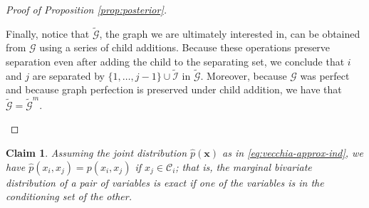 \documentclass[12pt,letterpaper]{article}
\theoremstyle{propstyle}
\theoremstyle{propstyle}
\theoremstyle{propstyle}
\theoremstyle{propstyle}
\newtheorem{claim}{Claim}
\theoremstyle{propstyle}
\newcommand{\bx}{\mathbf{x}}
\newcommand{\condset}{\mathcal{C}}
\newcommand{\obs}{\mathcal{I}}
\begin{document}
\begin{proof}[Proof of Proposition \ref{prop:posterior}]
\begin{enumerate}
Finally, notice that $\tilde{\mathcal{G}}$, the graph we are ultimately interested in, can be obtained from $\mathcal{G}$ using a series of child additions. Because these operations preserve separation even after adding the child to the separating set, we conclude that $i$ and $j$ are separated by $\{1, \dots, j-1\} \cup \tilde{\obs}$ in $\tilde{\mathcal{G}}$. Moreover, because $\mathcal{G}$ was perfect and because graph perfection is preserved under child addition, we have that $\tilde{\mathcal{G}} = \tilde{\mathcal{G}}^m$. 

\end{enumerate}
\end{proof}





\begin{claim}
Assuming the joint distribution $\hat{p}(\bx)$ as in \eqref{eq:vecchia-approx-ind}, we have $\hat{p}(x_i, x_j)=p(x_i, x_j)$ if $x_j \in \condset_i$; that is, the marginal bivariate distribution of a pair of variables is exact if one of the variables is in the conditioning set of the other.
\label{claim:marginals}
\end{claim}
\end{document}
